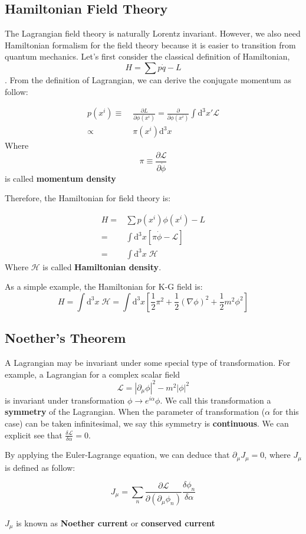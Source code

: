 \documentclass[12pt]{article}
\numberwithin{equation}{subsection}
\theoremstyle{mystyle}{\newtheorem{definition}{Definition}[subsection]}
\theoremstyle{mystyle}{\newtheorem{theorem}[definition]{Theorem}}
\theoremstyle{mystyle}{\newtheorem*{remark}{Remark}}
\theoremstyle{mystyle}{\newtheorem{example}{Example}[subsection]}
\theoremstyle{mystyle}{\newtheorem{examples}{Examples}[subsection]}
\theoremstyle{mystyle}{\newtheorem{cthm}{}[subsection]}
\newcommand{\tbf}[1]{\textbf{#1}}
\newcommand{\p}{\partial}
\newcommand{\id}{\mathrm{d}}
\begin{document}
\subsection{Hamiltonian Field Theory}
The Lagrangian field theory is naturally Lorentz invariant. However, we also need Hamiltonian formalism for the field theory
because it is easier to transition from quantum mechanics.
Let's first consider the classical definition of Hamiltonian, \[H=\sum p\dot{q}-L\].
From the definition of Lagrangian, we can derive the conjugate momentum as follow:
\begin{cthm}
  \begin{align*}
    p(x^i)\equiv & \;\frac{\p L}{\p \dot{\phi}(x^i)}
    =\frac{\p}{\p \dot{\phi}(x^i)}\int \mathrm{d}^3x' \mathcal{L} \\
    \propto      & \;\pi(x^i) \mathrm{d}^3x
  \end{align*}
  \bigskip
  Where \[\pi \equiv \frac{\p \mathcal{L}}{\p \dot{\phi}}\]
  is called \textbf{momentum density}
\end{cthm}
Therefore, the Hamiltonian for field theory is:
\begin{definition}
  \begin{align*}
    H=&\sum p(x^i)\phi(x^i)-L\\
    =& \int \id^3x\left[\pi \dot{\phi}-\mathcal{L}\right]\\
    =& \int \id^3x\;\mathcal{H}
  \end{align*}
  Where \(\mathcal{H}\) is called \tbf{Hamiltonian density}.
\end{definition}

\begin{example}
  As a simple example, the Hamiltonian for K-G field is:
  \[H=\int\id^3x\;\mathcal{H}=\int\id^3x\left[\frac{1}{2}\pi^2+\frac{1}{2}(\nabla\phi)^2+\frac{1}{2}m^2\phi^2\right]\]
\end{example}

\subsection{Noether's Theorem}
A Lagrangian may be invariant under some special type of transformation.
For example, a Lagrangian for a complex scalar field
\[\mathcal{L}= |\p_\mu \phi|^2 -m^2|\phi|^2\]
is invariant under transformation \(\phi \rightarrow e^{i\alpha}\phi\).
We call this transformation a \textbf{symmetry} of the Lagrangian.
When the parameter of transformation (\(\alpha\) for this case) can be taken infinitesimal,
we say this symmetry is \textbf{continuous}.
We can explicit see that \(\frac{\delta \mathcal{L}}{\delta \alpha}=0\).
\par By applying the Euler-Lagrange equation, we can deduce that \(\p_\mu J_{\mu}=0\),
where \(J_{\mu}\) is defined as follow:
\begin{definition}
  \[J_{\mu}= \sum_n\frac{\p \mathcal{L}}{\p(\p_\mu \phi_n)}\frac{\delta\phi_n}{\delta \alpha}\]\\
  \(J_{\mu}\) is known as \textbf{Noether current} or \textbf{conserved current}
\end{definition}
\end{document}
